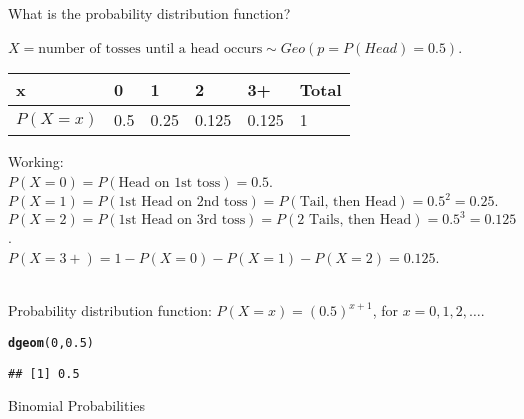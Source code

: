 \documentclass[bigtut]{tutorial}\usepackage[]{graphicx}\usepackage[]{color}
\makeatletter
\newcommand{\hlnum}[1]{\textcolor[rgb]{0.686,0.059,0.569}{#1}}%
\newcommand{\hlstd}[1]{\textcolor[rgb]{0.345,0.345,0.345}{#1}}%
\newcommand{\hlkwd}[1]{\textcolor[rgb]{0.737,0.353,0.396}{\textbf{#1}}}%
\newenvironment{kframe}{%
 \def\at@end@of@kframe{}%
 \ifinner\ifhmode%
  \def\at@end@of@kframe{\end{minipage}}%
  \begin{minipage}{\columnwidth}%
 \fi\fi%
 \def\FrameCommand##1{\hskip\@totalleftmargin \hskip-\fboxsep
 \colorbox{shadecolor}{##1}\hskip-\fboxsep
     \hskip-\linewidth \hskip-\@totalleftmargin \hskip\columnwidth}%
 \MakeFramed {\advance\hsize-\width
   \@totalleftmargin\z@ \linewidth\hsize
   \@setminipage}}%
 {\par\unskip\endMakeFramed%
 \at@end@of@kframe}
\newenvironment{knitrout}{}{} %
\makeatother
\begin{document}
\begin{tutorial}
\begin{questions}
What is the probability distribution function?

\begin{solution}
$X = \text{number of tosses until a head occurs} \sim Geo(p=P(Head)=0.5)$. \\

\begin{tabular}{| l | l | l | l | l | l|} \hline
x & 0  \hspace{1cm} & 1 \hspace{1cm}  & 2 \hspace{1cm} & 3+ \hspace{1cm}  &  Total \\ \hline
$P(X=x)$ & 0.5 & 0.25 & 0.125 & 0.125 & 1 \\ \hline
\end{tabular}

\vspace{.5cm}
Working: \\
$P(X=0) = P(\text{Head on 1st toss})= 0.5$.  \\
$P(X=1) = P(\text{1st Head on 2nd toss})= P(\text{Tail, then Head}) = 0.5^2 = 0.25$.\\
$P(X=2) = P(\text{1st Head on 3rd toss})= P(\text{2 Tails, then Head}) = 0.5^3 = 0.125$.\\
$P(X=3+) = 1-P(X=0) - P(X=1) - P(X=2) = 0.125$. \\\

Probability distribution function:
$P(X=x) = (0.5)^{x+1}$, for $x=0,1,2, \ldots$. \\

\begin{knitrout}
\color{fgcolor}\begin{kframe}
\begin{alltt}
\hlkwd{dgeom}\hlstd{(}\hlnum{0}\hlstd{,}\hlnum{0.5}\hlstd{)}
\end{alltt}
\begin{verbatim}
## [1] 0.5
\end{verbatim}
\end{kframe}
\end{knitrout}
\end{solution}



\newpage
\question Binomial Probabilities  \\

\end{questions}
\end{tutorial}
\end{document}
